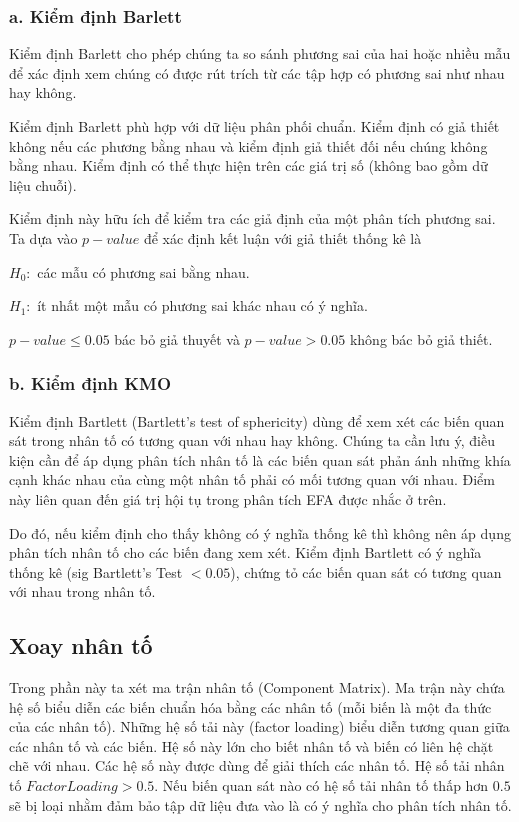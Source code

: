 \documentclass[../thesis.tex]{subfiles}
\begin{document}
\subsubsection{a. Kiểm định Barlett}

Kiểm định Barlett cho phép chúng ta so sánh phương sai của hai hoặc nhiều mẫu để xác định xem chúng có được rút trích từ các tập hợp có phương sai như nhau hay không.

Kiểm định Barlett phù hợp với dữ liệu phân phối chuẩn. Kiểm định có giả thiết không nếu các phương bằng nhau và kiểm định giả thiết đối nếu chúng không bằng nhau.
Kiểm định có thể thực hiện trên các giá trị số (không bao gồm dữ liệu chuỗi).

Kiểm định này hữu ích để kiểm tra các giả định của một phân tích phương sai. Ta dựa vào $ p-value $ để xác định kết luận với giả thiết thống kê là

$ H_0: $ các mẫu có phương sai bằng nhau.

$ H_1: $ ít nhất một mẫu có phương sai khác nhau có ý nghĩa.

$ p-value \leq 0.05 $ bác bỏ giả thuyết và
$ p-value > 0.05 $ không bác bỏ giả thiết.

\subsubsection{b. Kiểm định KMO}

Kiểm định Bartlett (Bartlett’s test of sphericity) dùng để xem xét các biến quan sát trong nhân tố có tương quan với nhau hay không. Chúng ta cần lưu ý, điều kiện cần để áp dụng phân tích nhân tố là các biến quan sát phản ánh những khía cạnh khác nhau của cùng một nhân tố phải có mối tương quan với nhau. Điểm này liên quan đến giá trị hội tụ trong phân tích EFA được nhắc ở trên. 

Do đó, nếu kiểm định cho thấy không có ý nghĩa thống kê thì không nên áp dụng phân tích nhân tố cho các biến đang xem xét. Kiểm định Bartlett có ý nghĩa thống kê (sig Bartlett’s Test $ < 0.05 $), chứng tỏ các biến quan sát có tương quan với nhau trong nhân tố.


\subsection{Xoay nhân tố}

Trong phần này ta xét ma trận nhân tố (Component Matrix). Ma trận này chứa hệ số biểu diễn các biến chuẩn hóa bằng các nhân tố (mỗi biến là một đa thức của các nhân tố). Những hệ số tải này (factor loading) biểu diễn tương quan giữa các nhân tố và các biến. Hệ số này lớn cho biết nhân tố và biến có liên hệ chặt chẽ với nhau. Các hệ số này được dùng để giải thích các nhân tố. Hệ số tải nhân tố $ Factor Loading > 0.5 $. Nếu biến quan sát nào có hệ số tải nhân tố thấp hơn $ 0.5 $ sẽ bị loại nhằm đảm bảo tập dữ liệu đưa vào là có ý nghĩa cho phân tích nhân tố. 
\end{document}
